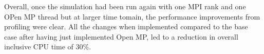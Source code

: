Overall, once the simulation had been run again with one MPI rank and one OPen MP thread but at larger time tomain, the performance improvements from profiling were clear.
All the changes when implemented compared to the base case after having just implemented Open MP, led to a reduction in overall inclusive CPU time of 30\%.
